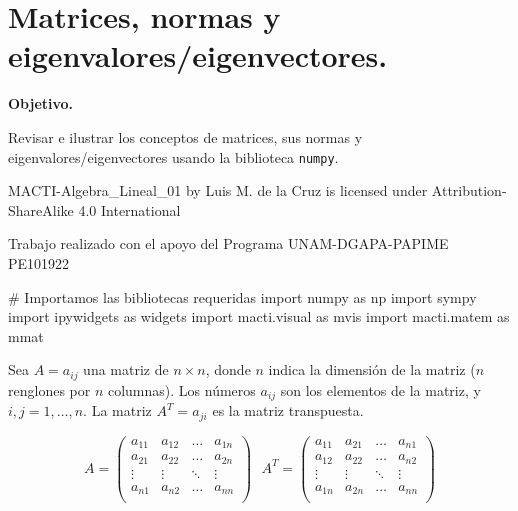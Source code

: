 \documentclass[
  letterpaper,
  DIV=11,
  numbers=noendperiod]{scrreprt}
\newenvironment{Shaded}{\begin{snugshade}}{\end{snugshade}}
\newcommand{\CommentTok}[1]{\textcolor[rgb]{0.37,0.37,0.37}{#1}}
\newcommand{\ImportTok}[1]{\textcolor[rgb]{0.00,0.46,0.62}{#1}}
\newcommand{\NormalTok}[1]{\textcolor[rgb]{0.00,0.23,0.31}{#1}}
\begin{document}

\chapter{Matrices, normas y
eigenvalores/eigenvectores.}\label{matrices-normas-y-eigenvaloreseigenvectores.}

\textbf{Objetivo.}

Revisar e ilustrar los conceptos de matrices, sus normas y
eigenvalores/eigenvectores usando la biblioteca \texttt{numpy}.

MACTI-Algebra\_Lineal\_01 by Luis M. de la Cruz is licensed under
Attribution-ShareAlike 4.0 International

Trabajo realizado con el apoyo del Programa UNAM-DGAPA-PAPIME PE101922

\begin{Shaded}
\begin{Highlighting}[]
\CommentTok{\# Importamos las bibliotecas requeridas}
\ImportTok{import}\NormalTok{ numpy }\ImportTok{as}\NormalTok{ np}
\ImportTok{import}\NormalTok{ sympy}
\ImportTok{import}\NormalTok{ ipywidgets }\ImportTok{as}\NormalTok{ widgets}
\ImportTok{import}\NormalTok{ macti.visual }\ImportTok{as}\NormalTok{ mvis}
\ImportTok{import}\NormalTok{ macti.matem }\ImportTok{as}\NormalTok{ mmat}
\end{Highlighting}
\end{Shaded}

Sea \(A = a_{ij}\) una matriz de \(n \times n\), donde \(n\) indica la
dimensión de la matriz (\(n\) renglones por \(n\) columnas). Los números
\(a_{ij}\) son los elementos de la matriz, y \(i,j = 1,\dots,n\). La
matriz \(A^T = {a_{ji}}\) es la matriz transpuesta.

\[
A = 
\left(
\begin{array}{cccc}
a_{11} & a_{12} & \dots & a_{1n}\\
a_{21} & a_{22} & \dots & a_{2n}\\
\vdots & \vdots& \ddots & \vdots \\
a_{n1} & a_{n2} & \dots & a_{nn}\\
\end{array}
\right)
\,\,\,\,
A^T = 
\left(
\begin{array}{cccc}
a_{11} & a_{21} & \dots & a_{n1}\\
a_{12} & a_{22} & \dots & a_{n2}\\
\vdots & \vdots& \ddots & \vdots \\
a_{1n} & a_{2n} & \dots & a_{nn}\\
\end{array}
\right)
\]
\end{document}

